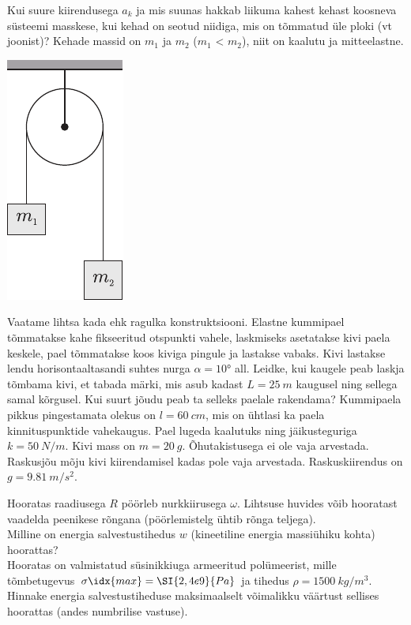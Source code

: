 \documentclass[10pt, twoside]{article}
\begin{document}
{%

Kui suure kiirendusega $a_k$ ja mis suunas hakkab liikuma kahest kehast koosneva süsteemi masskese, kui kehad on seotud niidiga, mis on tõmmatud üle ploki (vt joonist)? Kehade massid on $m_1$ ja $m_2$ ($m_1$ < $m_2$), niit on kaalutu ja mitteelastne.
\begin{center}
	\includegraphics[width=0.25\linewidth]{2006-lahg-05-yl}
\end{center}
\probend
\bigskip


Vaatame lihtsa kada ehk ragulka konstruktsiooni. Elastne kummipael tõmmatakse kahe fikseeritud otspunkti vahele, laskmiseks asetatakse kivi paela keskele, pael tõmmatakse koos kiviga pingule ja lastakse vabaks. Kivi lastakse lendu horisontaaltasandi suhtes nurga $\alpha = \ang{10}$ all. Leidke, kui kaugele peab laskja tõmbama kivi, et tabada märki, mis asub kadast $L = \SI{25}{m}$ kaugusel ning sellega samal kõrgusel. Kui suurt jõudu peab ta selleks paelale rakendama? Kummipaela pikkus pingestamata olekus on $l = \SI{60}{cm}$, mis on ühtlasi ka paela kinnituspunktide vahekaugus. Pael lugeda kaalutuks ning jäikusteguriga $k = \SI{50}{N/m}$. Kivi mass on $m = \SI{20}{g}$. Õhutakistusega ei ole vaja arvestada. Raskusjõu mõju kivi kiirendamisel kadas pole vaja arvestada. Raskuskiirendus on $g = \SI{9.81}{m/s^2}$.
\probend
\bigskip


Hooratas raadiusega $R$ pöörleb nurkkiirusega $\omega$. Lihtsuse huvides võib hooratast vaadelda peenikese rõngana (pöörlemistelg ühtib rõnga teljega).\\
\osa Milline on energia salvestustihedus $w$ (kineetiline energia massiühiku kohta) hoorattas?\\
\osa Hooratas on valmistatud süsinikkiuga armeeritud polümeerist, mille tõmbetugevus $\sigma\idx{max} = \SI{2,4e9}{Pa}$ ja tihedus $\rho = \SI{1500}{kg/m^3}$. Hinnake energia salvestustiheduse maksimaalselt võimalikku väärtust sellises hoorattas (andes numbrilise vastuse).

}
\end{document}
